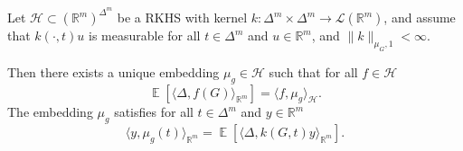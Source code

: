 \documentclass{article}
\DeclareMathOperator{\Expect}{\mathbb{E}}
\begin{document}
\begin{lemma}\label{lemma:embedding}
  Let $\mathcal{H} \subset {(\mathbb{R}^m)}^{\Delta^m}$ be a RKHS with kernel
  $k \colon \Delta^m \times \Delta^m \to \mathcal{L}(\mathbb{R}^m)$, and assume
  that $k(\cdot, t) u$ is measurable for all $t \in \Delta^m$ and
  $u \in \mathbb{R}^m$, and $\|k\|_{\mu_G,1} < \infty$.

  Then there exists a unique embedding $\mu_g \in \mathcal{H}$ such that for all
  $f \in \mathcal{H}$
  \begin{equation*}
    \Expect[\langle \Delta, f(G) \rangle_{\mathbb{R}^m}] = \langle f, \mu_g \rangle_{\mathcal{H}}.
  \end{equation*}
  The embedding $\mu_g$ satisfies for all $t \in \Delta^m$ and $y \in \mathbb{R}^m$
  \begin{equation*}
    \langle y, \mu_g(t) \rangle_{\mathbb{R}^m} = \Expect[\langle \Delta, k(G, t) y \rangle_{\mathbb{R}^m}].
  \end{equation*}
\end{lemma}
\end{document}
